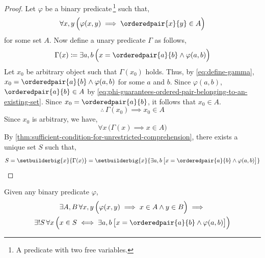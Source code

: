 \begin{proof}
    Let \( \varphi \) be a binary predicate\,\footnote{A predicate with two free variables.} such that,
    \begin{equation}
        \label{eq:phi-guarantees-ordered-pair-belonging-to-an-existing-set}
        \forall x,y \, \Big( \varphi(x,y) \implies \orderedpair{x}{y} \in A \Big)
    \end{equation}
    for some set \( A \). Now define a unary predicate \( \Gamma \) as follows,
    \begin{equation}
        \label{eq:define-gamma}
        \Gamma(x) \coloneq
        \exists a,b \, \Big( x = \orderedpair{a}{b} \land \varphi(a, b) \Big)
    \end{equation}
    Let \( x_{0} \) be arbitrary object such that \( \Gamma(x_{0}) \) holds. Thus, by
    \eqref{eq:define-gamma}, \( x_{0} = \orderedpair{a}{b} \land \varphi(a, b) \)
    for some \( a \) and \( b \). Since \( \varphi(a,b) \), \( \orderedpair{a}{b} \in A \)
    by \eqref{eq:phi-guarantees-ordered-pair-belonging-to-an-existing-set}.
    Since \( x_{0} = \orderedpair{a}{b} \), it follows that \( x_{0} \in A \).
    \begin{equation*}
        \therefore \, \Gamma(x_{0}) \implies x_{0} \in A
    \end{equation*}
    Since \( x_{0} \) is arbitrary, we have,
    \begin{equation*}
        \forall x \, \big( \Gamma(x) \implies x \in A \big)
    \end{equation*}
    By \cref{thm:sufficient-condition-for-unrestricted-comprehension}, there exists a unique
    set \( S \) such that,
    \begin{equation*}
        S = \setbuilderbig{x}{\Gamma(x)}
          = \setbuilderbig{x}{\exists a,b \, \big[ x = \orderedpair{a}{b} \land \varphi(a,b) \big]} \qedhere
    \end{equation*}
\end{proof}

\begin{thm}
    \label{thm:sufficient-condition-for-the-existence-of-sets-of-ordered-pairs-2}
    Given any binary predicate \( \varphi \),
    \begin{multline*}
        \exists A,B \, \forall x,y \, \Big( \varphi(x,y) \implies x \in A \land y \in B \Big)
        \implies \\
        \exists! S \, \forall x \, \Big( x \in S \iff \exists a,b \, \big[ x = \orderedpair{a}{b} \land \varphi(a,b) \big] \Big)
    \end{multline*}
\end{thm}

